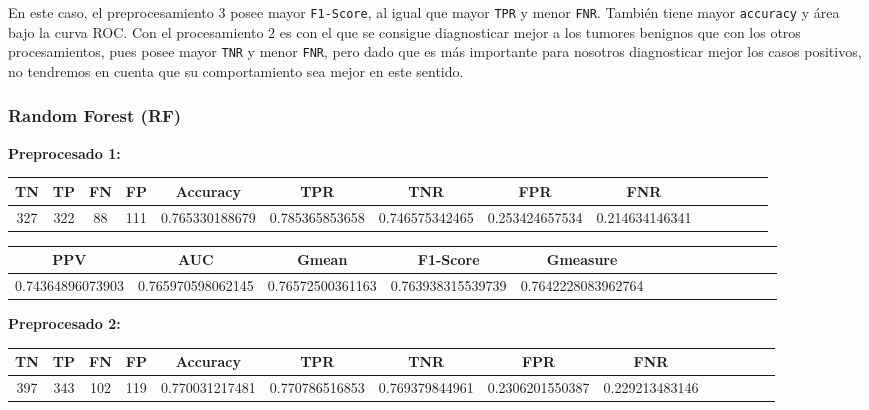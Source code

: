 \documentclass[a4]{article}
\begin{document}
En este caso, el preprocesamiento $3$ posee mayor \texttt{F1-Score}, al igual que mayor \texttt{TPR} y menor \texttt{FNR}. También tiene mayor \texttt{accuracy} y área bajo la curva ROC. Con el procesamiento $2$ es con el que se consigue diagnosticar mejor a los tumores benignos que con los otros procesamientos, pues posee mayor \texttt{TNR} y menor \texttt{FNR}, pero dado que es más importante para nosotros diagnosticar mejor los casos positivos, no tendremos en cuenta que su comportamiento sea mejor en este sentido.


\subsubsection{Random Forest (RF)}

\textbf{Preprocesado 1:}
\begin{center}
\begin{tabular}{|c|c|c|c|c|c|c|c|c|c|c|c|c|c|}
\hline
\multicolumn{1}{|c|}{\textbf{TN}}& \textbf{TP} & \textbf{FN} & \textbf{FP} & \textbf{Accuracy} & \textbf{TPR} & \textbf{TNR} & \textbf{FPR} &\textbf{FNR} \\ \hline
  327 & 322 & 88 & 111 & 0.765330188679 & 0.785365853658 & 0.746575342465 & 0.253424657534 & 0.214634146341 \\ \hline
\end{tabular}
\end{center}

\begin{center}
\begin{tabular}{|c|c|c|c|c|c|c|c|c|c|c|c|c|c|}
\hline
\multicolumn{1}{|c|}{\textbf{PPV}} & \textbf{AUC} & \textbf{Gmean} & \textbf{F1-Score} & \textbf{Gmeasure}  \\ \hline
  0.74364896073903 & 0.765970598062145 & 0.76572500361163 & 0.763938315539739 & 0.7642228083962764 \\ \hline
\end{tabular}
\end{center}

\newpage
\textbf{Preprocesado 2:}
\begin{center}
\begin{tabular}{|c|c|c|c|c|c|c|c|c|c|c|c|c|c|}
\hline
\multicolumn{1}{|c|}{\textbf{TN}}& \textbf{TP} & \textbf{FN} & \textbf{FP} & \textbf{Accuracy} & \textbf{TPR} & \textbf{TNR} & \textbf{FPR} &\textbf{FNR} \\ \hline
  397 & 343 & 102 & 119 & 0.770031217481 & 0.770786516853 & 0.769379844961 & 0.2306201550387 & 0.229213483146 \\ \hline
\end{tabular}
\end{center}
\end{document}
